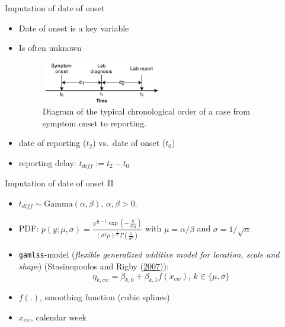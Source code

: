 \documentclass[
  ignorenonframetext,
  aspectratio=169,
]{beamer}
\providecommand{\tightlist}{%
  \setlength{\itemsep}{0pt}\setlength{\parskip}{0pt}}
\newcommand{\mli}[1]{\mathit{#1}}%
\begin{document}
\begin{frame}{Imputation of date of onset}
\protect\hypertarget{imputation-of-date-of-onset}{}
\begin{itemize}
\tightlist
\item
  Date of onset is a key variable
\item
  Is often unknown \pause

  \begin{figure}
  \centering
  \includegraphics[width=0.5\textwidth,keepaspectratio]{img/reporting_delay_diagram.png}
  \caption{Diagram of the typical chronological order of a case from symptom onset to reporting.}
  \end{figure}
  \pause
\item
  date of reporting (\(t_2\)) vs.~date of onset (\(t_0\))
\item
  reporting delay: \(t_\mli{diff} := t_2 - t_0\)
\end{itemize}
\end{frame}

\begin{frame}{Imputation of date of onset II}
\protect\hypertarget{imputation-of-date-of-onset-ii}{}
\begin{itemize}
\tightlist
\item
  \(t_\mli{diff} \sim \text{Gamma}(\alpha, \beta),\, \alpha,\beta > 0.\)
\item
  PDF:
  \(p(y;\mu,\sigma) = \frac{y^{\frac{1}{\sigma^2}-1} \exp\left(-\frac{y}{\sigma^2 \mu}\right)}{(\sigma^2 \mu)^{\frac{1}{\sigma^2}} \Gamma\left(\frac{1}{\sigma^2}\right)}\)
  with \(\mu = \alpha / \beta\) and \(\sigma = 1 / \sqrt{\alpha}\)
\item
  \texttt{gamlss}-model
  (\textit{flexible generalized additive model for location, scale and shape})
  (Stasinopoulos and Rigby
  (\protect\hyperlink{ref-stasinopoulos2007}{2007})):
  \[\eta_{k,\mli{cw}} = \beta_{k,0} + \beta_{k,1} f(x_\mli{cw}), \, k \in \{\mu, \sigma\}\]
\item
  \(f(.)\), smoothing function (cubic splines)
\item
  \(x_\mli{cw}\), calendar week
\end{itemize}
\end{frame}
\end{document}
